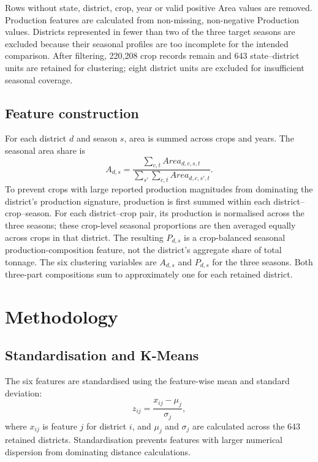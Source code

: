 \documentclass[9pt,a4paper,twocolumn]{extarticle}
\begin{document}
Rows without state, district, crop, year or valid positive Area values are removed. Production features are calculated from non-missing, non-negative Production values. Districts represented in fewer than two of the three target seasons are excluded because their seasonal profiles are too incomplete for the intended comparison. After filtering, 220,208 crop records remain and 643 state--district units are retained for clustering; eight district units are excluded for insufficient seasonal coverage.

\subsection{Feature construction}
For each district $d$ and season $s$, area is summed across crops and years. The seasonal area share is
\begin{equation}
 A_{d,s}=\frac{\sum_{c,t} Area_{d,c,s,t}}{\sum_{s'}\sum_{c,t} Area_{d,c,s',t}}.
\label{eq:area}
\end{equation}
To prevent crops with large reported production magnitudes from dominating the district's production signature, production is first summed within each district--crop--season. For each district--crop pair, its production is normalised across the three seasons; these crop-level seasonal proportions are then averaged equally across crops in that district. The resulting $P_{d,s}$ is a crop-balanced seasonal production-composition feature, not the district's aggregate share of total tonnage. The six clustering variables are $A_{d,s}$ and $P_{d,s}$ for the three seasons. Both three-part compositions sum to approximately one for each retained district.

\section{Methodology}
\subsection{Standardisation and K-Means}
The six features are standardised using the feature-wise mean and standard deviation:
\begin{equation}
 z_{ij}=\frac{x_{ij}-\mu_j}{\sigma_j},
\end{equation}
where $x_{ij}$ is feature $j$ for district $i$, and $\mu_j$ and $\sigma_j$ are calculated across the 643 retained districts. Standardisation prevents features with larger numerical dispersion from dominating distance calculations.
\end{document}
